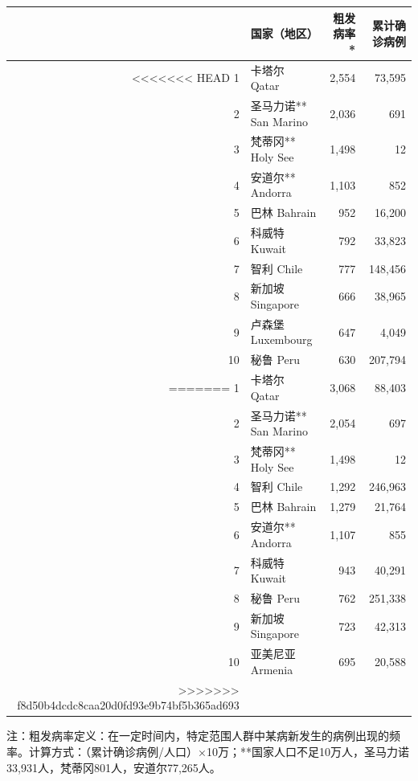 \documentclass[
]{article}
\begin{document}
\begin{table}[H]
\begin{minipage}{.7\linewidth}
    \centering
    \captionsetup{justification=centering}
     \caption{粗发病率前十位国家}
     \vspace{-0.5\baselineskip}
      \centering
    \captionsetup{justification=centering} \begin{table}[H]
\centering
\begin{tabular}{rlrr}
\toprule
  & 国家（地区） & 粗发病率* & 累计确诊病例\\
\midrule
<<<<<<< HEAD
\rowcolor{gray!6}  1 & 卡塔尔 Qatar & 2,554 & 73,595\\
2 & 圣马力诺** San Marino & 2,036 & 691\\
\rowcolor{gray!6}  3 & 梵蒂冈** Holy See & 1,498 & 12\\
4 & 安道尔** Andorra & 1,103 & 852\\
\rowcolor{gray!6}  5 & 巴林 Bahrain & 952 & 16,200\\
6 & 科威特 Kuwait & 792 & 33,823\\
\rowcolor{gray!6}  7 & 智利 Chile & 777 & 148,456\\
8 & 新加坡 Singapore & 666 & 38,965\\
\rowcolor{gray!6}  9 & 卢森堡 Luxembourg & 647 & 4,049\\
10 & 秘鲁 Peru & 630 & 207,794\\
=======
\rowcolor{gray!6}  1 & 卡塔尔 Qatar & 3,068 & 88,403\\
2 & 圣马力诺** San Marino & 2,054 & 697\\
\rowcolor{gray!6}  3 & 梵蒂冈** Holy See & 1,498 & 12\\
4 & 智利 Chile & 1,292 & 246,963\\
\rowcolor{gray!6}  5 & 巴林 Bahrain & 1,279 & 21,764\\
6 & 安道尔** Andorra & 1,107 & 855\\
\rowcolor{gray!6}  7 & 科威特 Kuwait & 943 & 40,291\\
8 & 秘鲁 Peru & 762 & 251,338\\
\rowcolor{gray!6}  9 & 新加坡 Singapore & 723 & 42,313\\
10 & 亚美尼亚 Armenia & 695 & 20,588\\
>>>>>>> f8d50b4dcdc8caa20d0fd93e9b74bf5b365ad693
\bottomrule
\end{tabular}
\end{table} \end{minipage}
    
    \begin{tablenotes}
        \fontsize{12}{12}
        \selectfont
        \item 注：粗发病率定义：在一定时间内，特定范围人群中某病新发生的病例出现的频率。计算方式：（累计确诊病例/人口）×10万；**国家人口不足10万人，圣马力诺33,931人，梵蒂冈801人，安道尔77,265人。  %
      \end{tablenotes}
\end{table}
\end{document}
